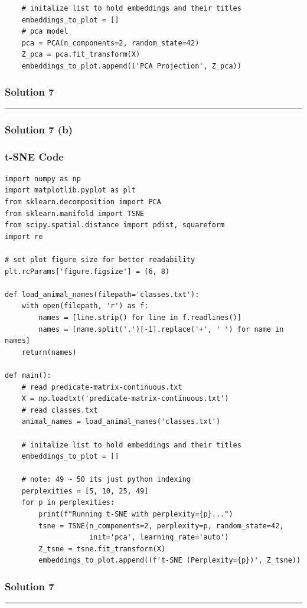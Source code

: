 \documentclass{article}
\begin{document}
{\begin{lstlisting}
    # initalize list to hold embeddings and their titles
    embeddings_to_plot = []
    # pca model
    pca = PCA(n_components=2, random_state=42)
    Z_pca = pca.fit_transform(X)
    embeddings_to_plot.append(('PCA Projection', Z_pca))
\end{lstlisting}

\newpage

\subsubsection*{Solution 7}
\noindent\rule{\textwidth}{0.4pt}
\subsubsection*{Solution 7 (b)}
\subsubsection*{t-SNE Code}
\begin{lstlisting}
import numpy as np
import matplotlib.pyplot as plt
from sklearn.decomposition import PCA
from sklearn.manifold import TSNE
from scipy.spatial.distance import pdist, squareform
import re 

# set plot figure size for better readability 
plt.rcParams['figure.figsize'] = (6, 8)

def load_animal_names(filepath='classes.txt'):
    with open(filepath, 'r') as f:
        names = [line.strip() for line in f.readlines()]
        names = [name.split('.')[-1].replace('+', ' ') for name in names]
    return(names)

def main():
    # read predicate-matrix-continuous.txt
    X = np.loadtxt('predicate-matrix-continuous.txt')
    # read classes.txt
    animal_names = load_animal_names('classes.txt')
    
    # initalize list to hold embeddings and their titles
    embeddings_to_plot = []
    
    # note: 49 ~ 50 its just python indexing
    perplexities = [5, 10, 25, 49]
    for p in perplexities:
        print(f"Running t-SNE with perplexity={p}...")
        tsne = TSNE(n_components=2, perplexity=p, random_state=42, 
                    init='pca', learning_rate='auto')
        Z_tsne = tsne.fit_transform(X)
        embeddings_to_plot.append((f't-SNE (Perplexity={p})', Z_tsne))
\end{lstlisting}

\newpage

\subsubsection*{Solution 7}
\noindent\rule{\textwidth}{0.4pt}
}
\end{document}
